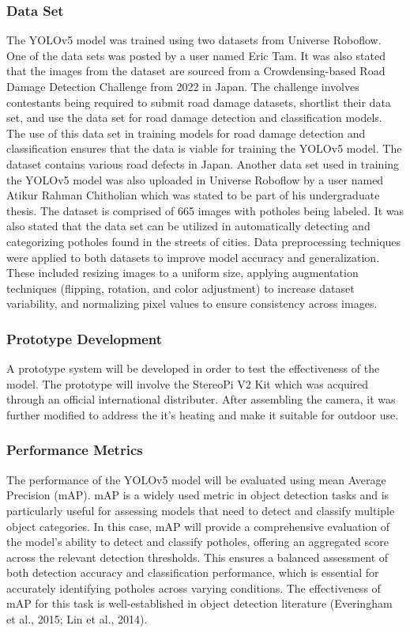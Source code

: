 \subsubsection{Data Set}
The YOLOv5 model was trained using two datasets from Universe Roboflow. One of the data sets was posted by a user named Eric Tam. It was also stated that the images from the dataset are sourced from a Crowdensing-based Road Damage Detection Challenge from 2022 in Japan. The challenge involves contestants being required to submit road damage datasets, shortlist their data set, and use the data set for road damage detection and classification models. The use of this data set in training models for road damage detection and classification ensures that the data is viable for training the YOLOv5 model. The dataset contains various road defects in Japan.
Another data set used in training the YOLOv5 model was also uploaded in Universe Roboflow by a user named Atikur Rahman Chitholian which was stated to be part of his undergraduate thesis. The dataset is comprised of 665 images with potholes being labeled. It was also stated that the data set can be utilized in automatically detecting and categorizing potholes found in the streets of cities.
Data preprocessing techniques were applied to both datasets to improve model accuracy and generalization. These included resizing images to a uniform size, applying augmentation techniques (flipping, rotation, and color adjustment) to increase dataset variability, and normalizing pixel values to ensure consistency across images. 

\subsubsection{Prototype Development}
A prototype system will be developed in order to test the effectiveness of the model. The prototype will involve the StereoPi V2 Kit which was acquired through an official international distributer. After assembling the camera, it was further modified to address the it's heating and make it suitable for outdoor use.

\subsubsection{Performance Metrics}
The performance of the YOLOv5 model will be evaluated using mean Average Precision (mAP). mAP is a widely used metric in object detection tasks and is particularly useful for assessing models that need to detect and classify multiple object categories. In this case, mAP will provide a comprehensive evaluation of the model's ability to detect and classify potholes, offering an aggregated score across the relevant detection thresholds. This ensures a balanced assessment of both detection accuracy and classification performance, which is essential for accurately identifying potholes across varying conditions. The effectiveness of mAP for this task is well-established in object detection literature (Everingham et al., 2015; Lin et al., 2014).

